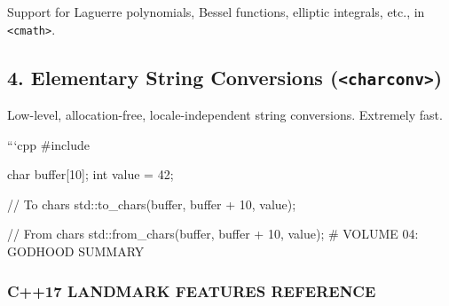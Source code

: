 Support for Laguerre polynomials, Bessel functions, elliptic integrals,
etc., in \passthrough{\lstinline!<cmath>!}.

\hypertarget{elementary-string-conversions-charconv}{%
\subsection{\texorpdfstring{4. Elementary String Conversions
(\texttt{\textless{}charconv\textgreater{}})}{4. Elementary String Conversions (\textless charconv\textgreater)}}\label{elementary-string-conversions-charconv}}

Low-level, allocation-free, locale-independent string conversions.
Extremely fast.

```cpp \#include

char buffer{[}10{]}; int value = 42;

// To chars std::to\_chars(buffer, buffer + 10, value);

// From chars std::from\_chars(buffer, buffer + 10, value); \# VOLUME
04: GODHOOD SUMMARY

\hypertarget{c17-landmark-features-reference}{%
\subsubsection{C++17 LANDMARK FEATURES
REFERENCE}\label{c17-landmark-features-reference}}

